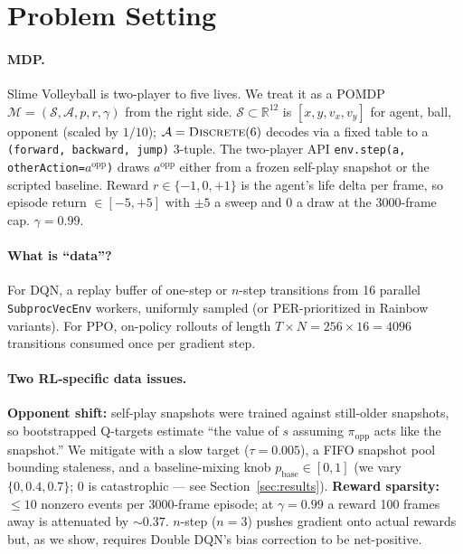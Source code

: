 \section{Problem Setting}
\label{sec:problem}

\paragraph{MDP.} Slime Volleyball is two-player to five lives. We
treat it as a POMDP $\mathcal{M}=(\mathcal{S},\mathcal{A},p,r,\gamma)$
from the right side. $\mathcal{S}\subset\mathbb{R}^{12}$ is
$[x,y,v_x,v_y]$ for agent, ball, opponent (scaled by $1/10$);
$\mathcal{A}=\textsc{Discrete}(6)$ decodes via a fixed table to a
\texttt{(forward, backward, jump)} 3-tuple. The two-player API
\texttt{env.step(a, otherAction=}$a^{\mathrm{opp}}$\texttt{)} draws
$a^{\mathrm{opp}}$ either from a frozen self-play snapshot or the
scripted baseline. Reward $r\in\{-1,0,+1\}$ is the agent's life delta
per frame, so episode return $\in[-5,+5]$ with $\pm 5$ a sweep and $0$
a draw at the 3000-frame cap. $\gamma=0.99$.

\paragraph{What is ``data''?} For DQN, a replay buffer of one-step or
$n$-step transitions from 16 parallel \texttt{SubprocVecEnv} workers,
uniformly sampled (or PER-prioritized in Rainbow variants). For PPO,
on-policy rollouts of length $T{\times}N=256{\times}16=4096$
transitions consumed once per gradient step.

\paragraph{Two RL-specific data issues.}
\textbf{Opponent shift:} self-play snapshots were trained against
still-older snapshots, so bootstrapped Q-targets estimate ``the value
of $s$ assuming $\pi_{\mathrm{opp}}$ acts like the snapshot.'' We
mitigate with a slow target ($\tau{=}0.005$), a FIFO snapshot pool
bounding staleness, and a baseline-mixing knob $p_{\mathrm{base}}\in
[0,1]$ (we vary $\{0,0.4,0.7\}$; $0$ is catastrophic --- see
Section~\ref{sec:results}). \textbf{Reward sparsity:} $\leq 10$
nonzero events per 3000-frame episode; at $\gamma{=}0.99$ a reward 100
frames away is attenuated by $\sim 0.37$. $n$-step ($n{=}3$) pushes
gradient onto actual rewards but, as we show, requires Double DQN's
bias correction to be net-positive.
